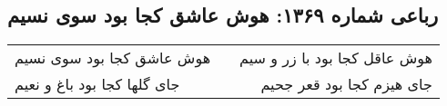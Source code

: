 \begin{center}
\section*{رباعی شماره ۱۳۶۹: هوش عاشق کجا بود سوی نسیم}
\label{sec:1369}
\begin{longtable}{l p{0.5cm} r}
هوش عاشق کجا بود سوی نسیم
&&
هوش عاقل کجا بود با زر و سیم
\\
جای گلها کجا بود باغ و نعیم
&&
جای هیزم کجا بود قعر جحیم
\\
\end{longtable}
\end{center}
